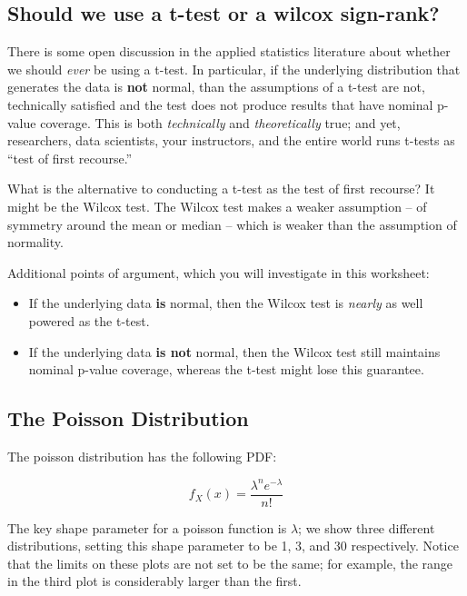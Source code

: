 \documentclass[
]{book}
\providecommand{\tightlist}{%
  \setlength{\itemsep}{0pt}\setlength{\parskip}{0pt}}
\theoremstyle{definition}
\theoremstyle{definition}
\theoremstyle{definition}
\theoremstyle{definition}
\theoremstyle{remark}
\begin{document}
\hypertarget{should-we-use-a-t-test-or-a-wilcox-sign-rank}{%
\subsection{Should we use a t-test or a wilcox sign-rank?}\label{should-we-use-a-t-test-or-a-wilcox-sign-rank}}

There is some open discussion in the applied statistics literature about whether we should \emph{ever} be using a t-test. In particular, if the underlying distribution that generates the data is \textbf{not} normal, than the assumptions of a t-test are not, technically satisfied and the test does not produce results that have nominal p-value coverage. This is both \emph{technically} and \emph{theoretically} true; and yet, researchers, data scientists, your instructors, and the entire world runs t-tests as ``test of first recourse.''

What is the alternative to conducting a t-test as the test of first recourse? It might be the Wilcox test. The Wilcox test makes a weaker assumption -- of symmetry around the mean or median -- which is weaker than the assumption of normality.

Additional points of argument, which you will investigate in this worksheet:

\begin{itemize}
\tightlist
\item
  If the underlying data \textbf{is} normal, then the Wilcox test is \emph{nearly} as well powered as the t-test.
\item
  If the underlying data \textbf{is not} normal, then the Wilcox test still maintains nominal p-value coverage, whereas the t-test might lose this guarantee.
\end{itemize}

\hypertarget{the-poisson-distribution}{%
\subsection{The Poisson Distribution}\label{the-poisson-distribution}}

The poisson distribution has the following PDF:

\[
f_X(x) = \frac{\lambda^n e^{-\lambda}}{n!}
\]

The key shape parameter for a poisson function is \(\lambda\); we show three different distributions, setting this shape parameter to be 1, 3, and 30 respectively. Notice that the limits on these plots are not set to be the same; for example, the range in the third plot is considerably larger than the first.
\end{document}
